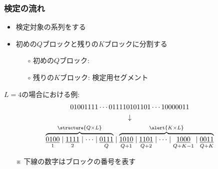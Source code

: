 \documentclass[dvipdfmx,11pt]{beamer}
\begin{document}
\begin{frame}[t]\frametitle{検定の流れ}
\begin{itemize}\setlength{\itemsep}{0.5\baselineskip}
  \item 検定対象の系列をする
  \item 初めの$Q$ブロックと残りの$K$ブロックに分割する
  \vspace{.5\baselineskip}
  \begin{itemize}\setlength{\itemsep}{.5\baselineskip}
    \item[$\circ$] 初めの$Q$ブロック: 
    \item[$\circ$] 残りの$K$ブロック: \alert{検定用セグメント}
  \end{itemize}
\end{itemize}
%
\vspace{\baselineskip}
$L=4$の場合における例:
%
\begin{gather*}
  01001111\cdots011110101101\cdots10000011 \\
  \downarrow \\
  \overbrace{\underset{1}{\underline{0100}}\mid\underset{2}{\underline{1111}}\mid\cdots\mid\underset{Q}{\underline{0111}}}^{\structure{Q\times L}} \mid \overbrace{\underset{Q+1}{\underline{1010}}\mid\underset{Q+2}{\underline{1101}}\mid\cdots\mid\underset{Q+K-1}{\underline{1000}}\mid\underset{Q+K}{\underline{0011}}}^{\alert{K\times L}}
\end{gather*}
%
\begin{itemize}
  \item[※] 下線の数字はブロックの番号を表す 
\end{itemize}
\end{frame}
\end{document}
